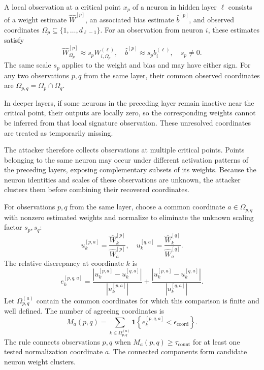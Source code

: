 \documentclass[runningheads]{llncs}
\begin{document}
\begin{definition}
\label{def:observation}
A local observation at a critical point $x_p$ of a neuron in hidden layer $\ell$ consists of a weight estimate $\widehat W^{[p]}$, an associated bias estimate $\widehat b^{[p]}$, and observed coordinates $\Omega_p\subseteq\{1,\ldots,d_{\ell-1}\}$.
For an observation from neuron $i$, these estimates satisfy
\begin{equation*}
\widehat W^{[p]}_{\Omega_p}\approx s_pW_{i,\Omega_p}^{(\ell)},\quad\widehat b^{[p]}\approx s_pb_i^{(\ell)},\quad s_p\ne0.
\end{equation*}
The same scale $s_p$ applies to the weight and bias and may have either sign.
For any two observations $p,q$ from the same layer, their common observed coordinates are $\Omega_{p,q}=\Omega_p\cap\Omega_q$.
\end{definition}
In deeper layers, if some neurons in the preceding layer remain inactive near the critical point, their outputs are locally zero, so the corresponding weights cannot be inferred from that local signature observation.
These unresolved coordinates are treated as temporarily missing.

The attacker therefore collects observations at multiple critical points.
Points belonging to the same neuron may occur under different activation patterns of the preceding layers, exposing complementary subsets of its weights.
Because the neuron identities and scales of these observations are unknown, the attacker clusters them before combining their recovered coordinates.

\begin{definition}
\label{def:clustering}
For observations $p,q$ from the same layer, choose a common coordinate $a\in\Omega_{p,q}$ with nonzero estimated weights and normalize to eliminate the unknown scaling factor $s_p,s_q$:
\begin{equation*}u_k^{[p,a]}=\frac{\widehat W_k^{[p]}}{\widehat W_a^{[p]}},\quad u_k^{[q,a]} =\frac{\widehat W_k^{[q]}}{\widehat W_a^{[q]}}.
\end{equation*}
The relative discrepancy at coordinate $k$ is
\begin{equation*}
e_k^{[p,q,a]}=\frac{|u_k^{[p,a]}-u_k^{[q,a]}|}{|u_k^{[p,a]}|}+\frac{|u_k^{[p,a]}-u_k^{[q,a]}|}{|u_k^{[q,a]}|}.
\end{equation*}
Let $\Omega_{p,q}^{(a)}$ contain the common coordinates for which this comparison is finite and well defined.
The number of agreeing coordinates is
\begin{equation*}
M_a(p,q)=\sum_{k\in\Omega_{p,q}^{(a)}}\mathbf 1\!\left\{e_k^{[p,q,a]}<\epsilon_{\mathrm{coord}}\right\}.
\end{equation*}
The rule connects observations $p,q$ when $M_a(p,q)\geq\tau_{\mathrm{count}}$ for at least one tested normalization coordinate $a$.
The connected components form candidate neuron weight clusters.
\end{definition}
\end{document}

